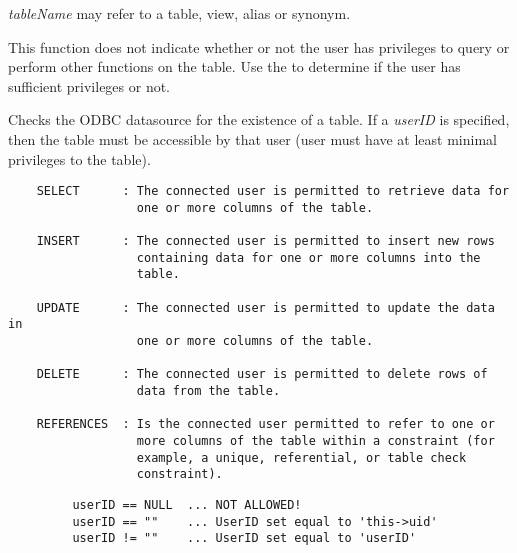 
{\it tableName} may refer to a table, view, alias or synonym.

This function does not indicate whether or not the user has privileges to query or perform other functions on the table.  Use the  to determine if the user has sufficient privileges or not.



\label{wxdbtableprivileges}


Checks the ODBC datasource for the existence of a table.  If a {\it userID}
is specified, then the table must be accessible by that user (user must have
at least minimal privileges to the table).


\begin{verbatim}
    SELECT      : The connected user is permitted to retrieve data for
                  one or more columns of the table.

    INSERT      : The connected user is permitted to insert new rows
                  containing data for one or more columns into the
                  table.

    UPDATE      : The connected user is permitted to update the data in
                  one or more columns of the table.

    DELETE      : The connected user is permitted to delete rows of
                  data from the table.

    REFERENCES  : Is the connected user permitted to refer to one or
                  more columns of the table within a constraint (for
                  example, a unique, referential, or table check
                  constraint).
\end{verbatim}
\begin{verbatim}
         userID == NULL  ... NOT ALLOWED!
         userID == ""    ... UserID set equal to 'this->uid'
         userID != ""    ... UserID set equal to 'userID'
\end{verbatim}

